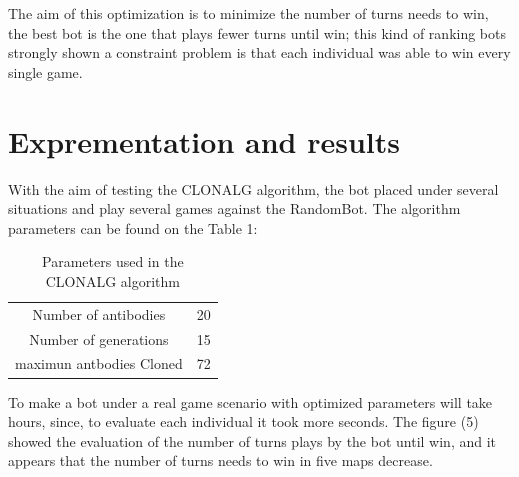 \documentclass[]{interact}
\theoremstyle{plain}%
\theoremstyle{definition}
\theoremstyle{remark}
\begin{document}
The aim of this optimization is to minimize the number of turns needs to win, the best bot is the one that plays fewer turns until win; this kind of ranking bots strongly shown a constraint problem is that each individual was able to win every single game.

\section{Exprementation and results}
With the aim of testing the CLONALG algorithm, the bot placed under several situations and play several games against the RandomBot. The algorithm parameters can be found on the Table 1:
\begin{table}[h!]
\centering
\begin{tabular}{ |c|c| }
\hline
 Number of antibodies & 20 \\ 
 Number of generations & 15 \\  
 maximun antbodies Cloned & 72 \\ 
 \hline   
\end{tabular}
\caption{Parameters used in the CLONALG algorithm}
\label{TABLE 1}
\end{table}


To make a bot under a real game scenario with optimized parameters will take hours, since, to evaluate each individual it took more seconds. The figure (5) showed the evaluation of the number of turns plays by the bot until win, and it appears that the number of turns needs to win in five maps decrease. \\

\end{document}
